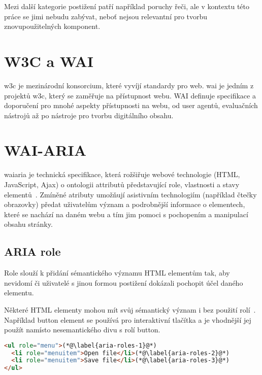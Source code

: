 Mezi další kategorie postižení patří například poruchy řeči, ale v kontextu této práce se jimi nebudu zabývat, neboť nejsou relevantní pro tvorbu znovupoužitelných komponent.

\section{W3C a WAI}


\gls{w3c} je mezinárodní konsorcium, které vyvíjí standardy pro web.
\gls{wai} je jedním z projektů \gls{w3c}, který se zaměřuje na přístupnost webu.
WAI definuje specifikace a doporučení pro mnohé aspekty přístupnosti na webu, od user agentů, evaluačních nástrojů až po nástroje pro tvorbu digitálního obsahu.

\section{WAI-ARIA}

\gls{waiaria} je technická specifikace, která rožšiřuje webové technologie (HTML, JavaScript, Ajax) o ontologii attributů představující role, vlastnosti a stavy elementů~\cite{wai-aria}.
Zmíněné atributy umožňují asistivním technologiím (například čtečky obrazovky) předat uživatelům význam a podrobnější informace o elementech, které se nachází na daném webu a tím jim pomoci s pochopením a manipulací obsahu stránky.

\subsection{ARIA role}

Role slouží k přidání sémantického významu HTML elementům tak, aby nevidomí či uživatelé s jinou formou postižení dokázali pochopit účel daného elementu.

Některé HTML elementy mohou mít svůj sémantický význam i bez použití rolí~\cite{wai-implicit-semantics}.
Například button element se používá pro interaktivní tlačítka a je vhodnější jej použít namísto nesemantického divu s rolí button.

\clearpage

\begin{lstlisting}[caption={Aria role}, label={aria-roles}, language=html]
<ul role="menu">(*@\label{aria-roles-1}@*)
  <li role="menuitem">Open file</li>(*@\label{aria-roles-2}@*)
  <li role="menuitem">Save file</li>(*@\label{aria-roles-3}@*)
</ul>
\end{lstlisting}

